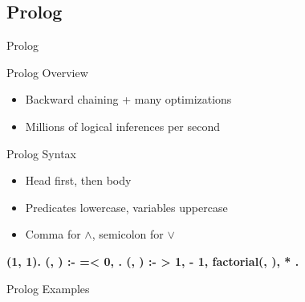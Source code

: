 \documentclass[14pt]{beamer}
\begin{document}
\subsection{Prolog}
\begin{frame}[fragile]{Prolog}
	\begin{block}{Prolog Overview}
		\begin{itemize}
			\item Backward chaining + many optimizations
			\item Millions of logical inferences per second
		\end{itemize}
	\end{block}
	\pause
	\begin{block}{Prolog Syntax}
		\begin{itemize}
			\item Head first, then body
			\item Predicates lowercase, variables uppercase
			\item Comma for $\land$, semicolon for $\lor$
		\end{itemize}
		\begin{semiverbatim}\bfseries\footnotesize
			(1, 1).
			(, \str{_}) :-  =< 0, .
			(, ) :-  > 1,    - 1,
			                   factorial(, ),    * .
		\end{semiverbatim}
	\end{block}
\end{frame}
\begin{frame}
	\begin{center}
		\Huge Prolog Examples
	\end{center}
\end{frame}
\end{document}
